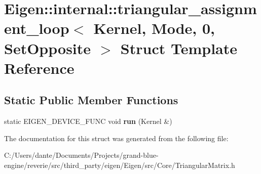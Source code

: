 \hypertarget{struct_eigen_1_1internal_1_1triangular__assignment__loop_3_01_kernel_00_01_mode_00_010_00_01_set_opposite_01_4}{}\section{Eigen\+::internal\+::triangular\+\_\+assignment\+\_\+loop$<$ Kernel, Mode, 0, Set\+Opposite $>$ Struct Template Reference}
\label{struct_eigen_1_1internal_1_1triangular__assignment__loop_3_01_kernel_00_01_mode_00_010_00_01_set_opposite_01_4}
\subsection*{Static Public Member Functions}
\begin{DoxyCompactItemize}
\item 
\mbox{\label{struct_eigen_1_1internal_1_1triangular__assignment__loop_3_01_kernel_00_01_mode_00_010_00_01_set_opposite_01_4_aff2b0c2fdbd41a210f485ce83175df7b}} 
static E\+I\+G\+E\+N\+\_\+\+D\+E\+V\+I\+C\+E\+\_\+\+F\+U\+NC void {\bfseries run} (Kernel \&)
\end{DoxyCompactItemize}


The documentation for this struct was generated from the following file\+:\begin{DoxyCompactItemize}
\item 
C\+:/\+Users/dante/\+Documents/\+Projects/grand-\/blue-\/engine/reverie/src/third\+\_\+party/eigen/\+Eigen/src/\+Core/Triangular\+Matrix.\+h\end{DoxyCompactItemize}

